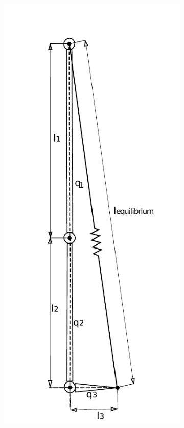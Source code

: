 \begin{figure}[ht!]
    \centering
    \begin{subfigure}[b]{0.25\textwidth}
        \includegraphics[width=\textwidth]{figures/spring_model_equilibrium.pdf}

\end{subfigure}
\end{figure}
